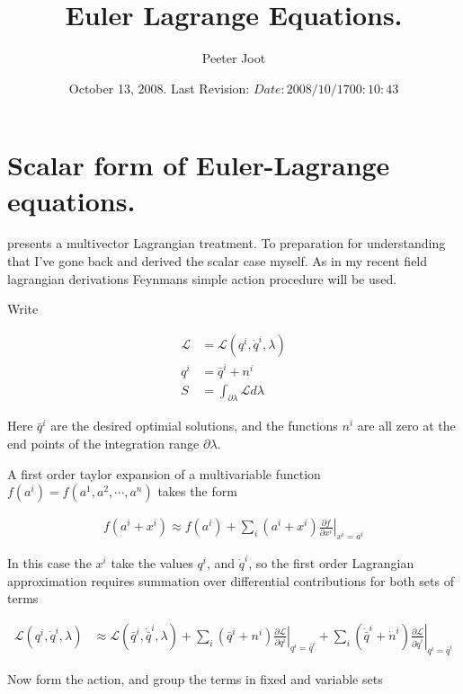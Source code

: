 \documentclass{article}
\title{Euler Lagrange Equations.}
\author{Peeter Joot}
\date{ October 13, 2008.  Last Revision: $Date: 2008/10/17 00:10:43 $ }
\newcommand{\LL}[0]{\mathcal{L}}
\newcommand{\qdot}[0]{\dot{q}}
\newcommand{\ndot}[0]{\dot{n}}
\newcommand{\qbar}[0]{\bar{q}}
\newcommand{\qdotbar}[0]{\dot{\bar{q}}}
\newcommand{\PD}[2]{\frac{\partial {#2}}{\partial {#1}}}
\begin{document}
\maketitle{}

\tableofcontents

\section{Scalar form of Euler-Lagrange equations.}

\cite{lasenby1993mda} presents a multivector Lagrangian treatment.  To
preparation for understanding that I've gone 
back and derived the scalar
case myself.  As in my recent field lagrangian derivations Feynmans
\cite{feynman1963flp} simple action procedure will be used.

Write 

\begin{align*}
\LL &= \LL(q^i, \qdot^i, \lambda) \\
q^i &= \qbar^i + n^i \\
S &= \int_{\partial \lambda} \LL d\lambda
\end{align*}

Here $\qbar^i$ are the desired optimial solutions, and the functions $n^i$
are all zero at the end points of the integration range $\partial \lambda$.

A first order taylor expansion of a multivariable function
$f(a^i) = f(a^1, a^2, \cdots, a^n)$
takes the form

\begin{align*}
f(a^i + x^i) \approx f(a^i) + \sum_i (a^i + x^i) \left. \PD{x^i}{f} \right\vert_{x^i = a^i}
\end{align*}

In this case the $x^i$ take the values $q^i$, and $\qdot^i$, so the first
order Lagrangian approximation requires summation over differential contributions for both sets of terms

\begin{align}\label{eqn:linearizedLagrangian}
\LL(q^i, \qdot^i, \lambda) 
&\approx \LL(\qbar^i, \qdotbar^i, \lambda) 
+ \sum_i (\qbar^i + n^i) \left. \PD{q^i}{\LL} \right\vert_{q^i = \qbar^i}
+ \sum_i (\qdotbar^i + \ndot^i) \left. \PD{\qdot^i}{\LL} \right\vert_{q^i = \qbar^i}
\end{align}

%
Now form the action, and group the terms in fixed and variable sets
\end{document}

